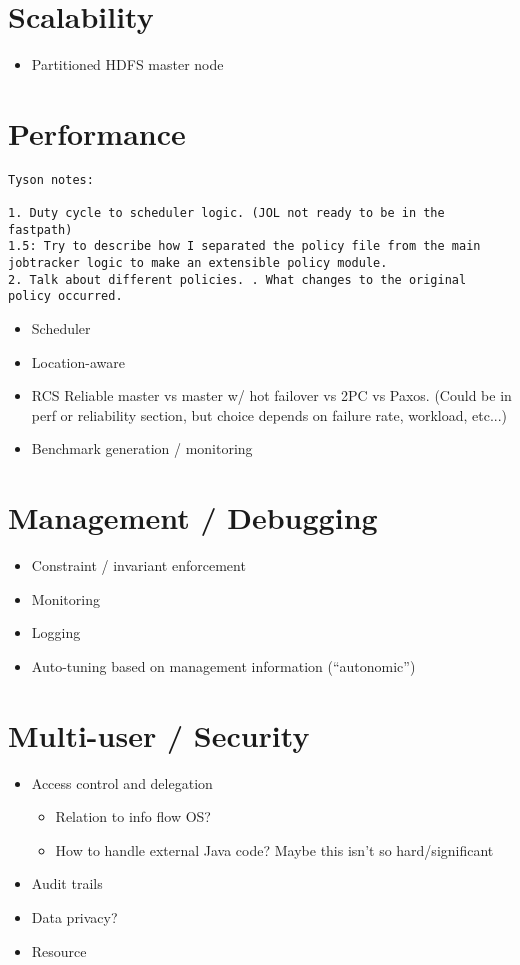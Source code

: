 \documentclass{sig-alternate}
\begin{document}
\section{Scalability}
\begin{itemize}
\item
  Partitioned HDFS master node
\end{itemize}

\section{Performance}

\begin{verbatim}
Tyson notes:

1. Duty cycle to scheduler logic. (JOL not ready to be in the fastpath)
1.5: Try to describe how I separated the policy file from the main jobtracker logic to make an extensible policy module.
2. Talk about different policies. . What changes to the original policy occurred. 

\end{verbatim}

\begin{itemize}
\item
  Scheduler
\item
  Location-aware
\item
  RCS Reliable master vs master w/ hot failover vs 2PC vs Paxos.  (Could be in perf or reliability section, but choice depends on failure rate, workload, etc...)
\item
  Benchmark generation / monitoring
\end{itemize}

\section{Management / Debugging}
\begin{itemize}
\item
  Constraint / invariant enforcement
\item
  Monitoring
\item
  Logging
\item
  Auto-tuning based on management information (``autonomic'')
\end{itemize}

\section{Multi-user / Security}
\begin{itemize}
\item
  Access control and delegation
  \begin{itemize}
  \item
    Relation to info flow OS?
  \item
    How to handle external Java code? Maybe this isn't so hard/significant
  \end{itemize}
\item
  Audit trails
\item
  Data privacy?
\item
  Resource
\end{itemize}
\end{document}
